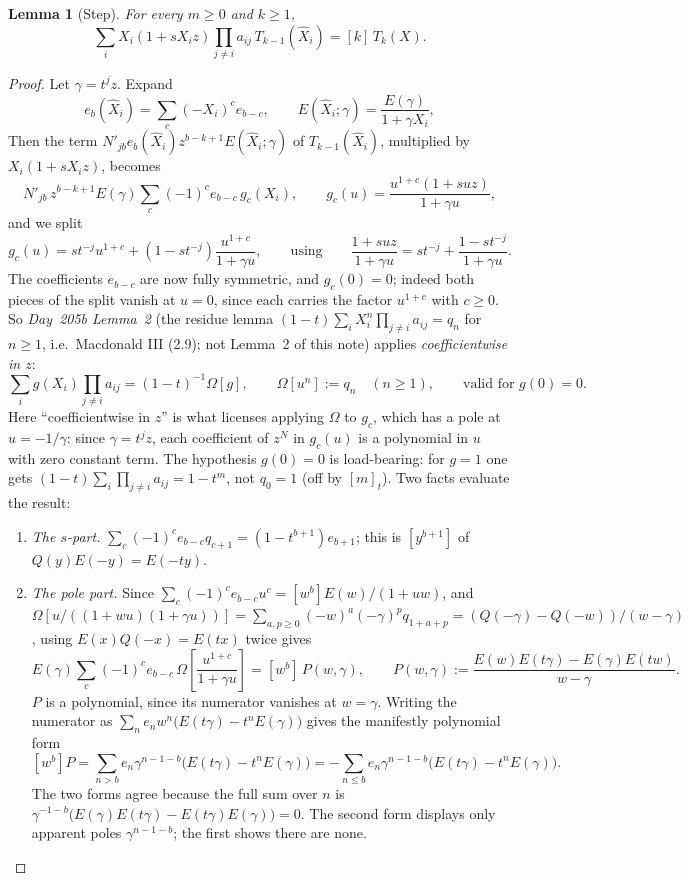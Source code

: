 \documentclass[11pt]{amsart}
\newtheorem{lemma}[theorem]{Lemma}
\theoremstyle{remark}
\newcommand{\hX}{\widehat{X}}
\begin{document}
\begin{lemma}[Step]\label{lem:step}
For every $m\ge0$ and $k\ge1$,
\[
\sum_iX_i(1+sX_iz)\prod_{j\ne i}a_{ij}\,T_{k-1}(\hX_i)=[k]\,T_k(X).
\]
\end{lemma}

\begin{proof}
Let $\gamma=t^jz$. Expand
\[
e_b(\hX_i)=\sum_c(-X_i)^ce_{b-c},\qquad E(\hX_i;\gamma)=\frac{E(\gamma)}{1+\gamma X_i},
\]
Then the term $N'_{jb}e_b(\hX_i)z^{b-k+1}E(\hX_i;\gamma)$ of $T_{k-1}(\hX_i)$, multiplied by $X_i(1+sX_iz)$, becomes
\[
N'_{jb}\,z^{b-k+1}E(\gamma)\sum_c(-1)^ce_{b-c}\,g_c(X_i),\qquad
g_c(u)=\frac{u^{1+c}(1+suz)}{1+\gamma u},
\]
and we split
\[
g_c(u)=st^{-j}u^{1+c}+(1-st^{-j})\frac{u^{1+c}}{1+\gamma u},
\qquad\text{using}\qquad
\frac{1+suz}{1+\gamma u}=st^{-j}+\frac{1-st^{-j}}{1+\gamma u}.
\]
The coefficients $e_{b-c}$ are now fully symmetric, and $g_c(0)=0$; indeed both pieces of the split vanish at $u=0$, since each carries the factor $u^{1+c}$ with $c\ge0$. So \emph{Day~205b Lemma~2} (the residue lemma $(1-t)\sum_iX_i^n\prod_{j\ne i}a_{ij}=q_n$ for $n\ge1$, i.e.\ Macdonald III (2.9); not Lemma~2 of this note) applies \emph{coefficientwise in $z$}:
\[
\sum_ig(X_i)\prod_{j\ne i}a_{ij}=(1-t)^{-1}\Omega[g],\qquad \Omega[u^n]:=q_n\quad(n\ge1),\qquad\text{valid for }g(0)=0.
\]
Here ``coefficientwise in $z$'' is what licenses applying $\Omega$ to $g_c$, which has a pole at $u=-1/\gamma$: since $\gamma=t^jz$, each coefficient of $z^N$ in $g_c(u)$ is a polynomial in $u$ with zero constant term. The hypothesis $g(0)=0$ is load-bearing: for $g=1$ one gets $(1-t)\sum_i\prod_{j\ne i}a_{ij}=1-t^m$, not $q_0=1$ (off by $[m]_t$). Two facts evaluate the result:
\begin{enumerate}[label=(\alph*)]
\item \emph{The $s$-part.} $\sum_c(-1)^ce_{b-c}q_{c+1}=(1-t^{b+1})e_{b+1}$; this is $[y^{b+1}]$ of $Q(y)E(-y)=E(-ty)$.
\item \emph{The pole part.} Since $\sum_c(-1)^ce_{b-c}u^c=[w^b]E(w)/(1+uw)$, and $\Omega[u/((1+wu)(1+\gamma u))]=\sum_{a,p\ge0}(-w)^a(-\gamma)^pq_{1+a+p}=(Q(-\gamma)-Q(-w))/(w-\gamma)$, using $E(x)Q(-x)=E(tx)$ twice gives
\[
E(\gamma)\sum_c(-1)^ce_{b-c}\,\Omega\!\left[\frac{u^{1+c}}{1+\gamma u}\right]=[w^b]\,P(w,\gamma),\qquad
P(w,\gamma):=\frac{E(w)E(t\gamma)-E(\gamma)E(tw)}{w-\gamma}.
\]
$P$ is a polynomial, since its numerator vanishes at $w=\gamma$. Writing the numerator as $\sum_ne_nw^n\bigl(E(t\gamma)-t^nE(\gamma)\bigr)$ gives the manifestly polynomial form
\[
[w^b]P=\sum_{n>b}e_n\gamma^{n-1-b}\bigl(E(t\gamma)-t^nE(\gamma)\bigr)
=-\sum_{n\le b}e_n\gamma^{n-1-b}\bigl(E(t\gamma)-t^nE(\gamma)\bigr).
\]
The two forms agree because the full sum over $n$ is $\gamma^{-1-b}\bigl(E(\gamma)E(t\gamma)-E(t\gamma)E(\gamma)\bigr)=0$. The second form displays only apparent poles $\gamma^{n-1-b}$; the first shows there are none.
\end{enumerate}


\end{proof}
\end{document}
